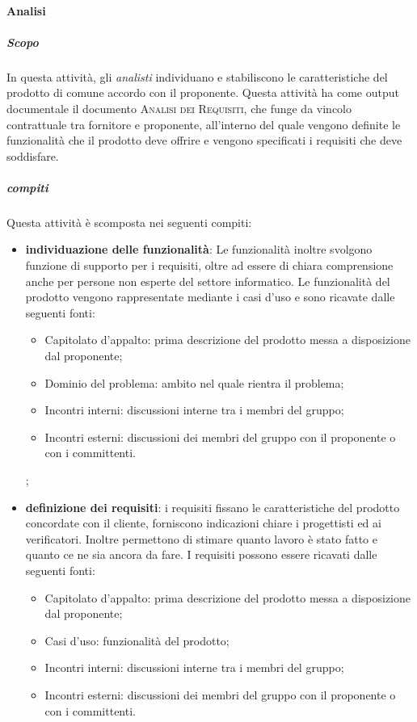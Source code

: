 \paragraph{Analisi}
\label{ssub:analisi}
\subparagraph{Scopo}
\label{par:analisi:scopo}
In questa attività, gli \emph{analisti} individuano e stabiliscono le caratteristiche del prodotto di comune accordo con il proponente. Questa attività ha come output documentale il documento \textsc{Analisi dei Requisiti}, che funge da vincolo contrattuale tra fornitore e proponente, all'interno del quale vengono definite le funzionalità che il prodotto deve offrire e vengono specificati i requisiti che deve soddisfare.\\
\subparagraph{compiti}
\label{par:analisi:compiti}
Questa attività è scomposta nei seguenti compiti:
\begin{itemize}
	\item \textbf{individuazione delle funzionalità}: Le funzionalità inoltre svolgono funzione di supporto per i requisiti, oltre ad essere
    di chiara comprensione anche per persone non esperte del settore informatico. Le funzionalità del prodotto vengono rappresentate mediante i casi d'uso e sono ricavate dalle seguenti fonti:
    \begin{itemize}
        \item Capitolato d'appalto: prima descrizione del prodotto messa a disposizione dal proponente;
        \item Dominio del problema: ambito nel quale rientra il problema;
        \item Incontri interni: discussioni interne tra i membri del gruppo;
        \item Incontri esterni: discussioni dei membri del gruppo con il proponente o con i committenti.
    \end{itemize};
	\item \textbf{definizione dei requisiti}: i requisiti fissano le caratteristiche del prodotto concordate con il cliente, forniscono indicazioni chiare i progettisti ed ai verificatori. Inoltre permettono di stimare quanto lavoro è stato fatto e quanto ce ne sia ancora da fare. I requisiti possono essere ricavati dalle seguenti fonti:
    \begin{itemize}
        \item Capitolato d'appalto: prima descrizione del prodotto messa a disposizione dal proponente;
        \item Casi d'uso: funzionalità del prodotto;
        \item Incontri interni: discussioni interne tra i membri del gruppo;
        \item Incontri esterni: discussioni dei membri del gruppo con il proponente o con i committenti.
    \end{itemize}
\end{itemize}
